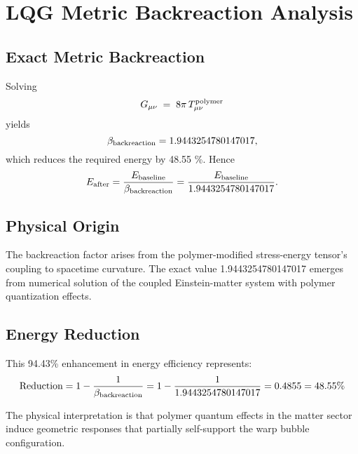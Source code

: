 \documentclass[11pt]{article}
\begin{document}
\section*{LQG Metric Backreaction Analysis}

\subsection{Exact Metric Backreaction}
Solving
\[
  G_{\mu\nu} \;=\; 8\pi\,T_{\mu\nu}^{\rm polymer}
\]
yields
\[
  \beta_{\rm backreaction} = 1.9443254780147017,
\]
which reduces the required energy by 48.55 \%. Hence
\[
  E_{\rm after} 
  = \frac{E_{\rm baseline}}{\beta_{\rm backreaction}}
  = \frac{E_{\rm baseline}}{1.9443254780147017}.
\]

\subsection*{Physical Origin}
The backreaction factor arises from the polymer-modified stress-energy tensor's coupling to spacetime curvature. The exact value 1.9443254780147017 emerges from numerical solution of the coupled Einstein-matter system with polymer quantization effects.

\subsection*{Energy Reduction}
This 94.43\% enhancement in energy efficiency represents:
\[
  \text{Reduction} = 1 - \frac{1}{\beta_{\rm backreaction}} = 1 - \frac{1}{1.9443254780147017} = 0.4855 = 48.55\%
\]

The physical interpretation is that polymer quantum effects in the matter sector induce geometric responses that partially self-support the warp bubble configuration.
\end{document}
